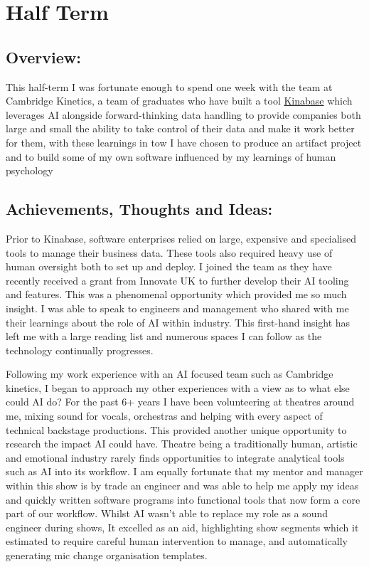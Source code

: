 \section{Half Term}

\subsection*{Overview:}
This half-term I was fortunate enough to spend one week with the team at Cambridge Kinetics, a team of graduates who have built a tool \href{https://www.kinabase.com}{Kinabase} which leverages AI alongside forward-thinking data handling to provide companies both large and small the ability to take control of their data and make it work better for them, with these learnings in tow I have chosen to produce an artifact project and to build some of my own software influenced by my learnings of human psychology

\subsection*{Achievements, Thoughts and Ideas:}
Prior to Kinabase, software enterprises relied on large, expensive and specialised tools to manage their business data. These tools also required heavy use of human oversight both to set up and deploy. I joined the team as they have recently received a grant from Innovate UK to further develop their AI tooling and features. This was a phenomenal opportunity which provided me so much insight. I was able to speak to engineers and management who shared with me their learnings about the role of AI within industry. This first-hand insight has left me with a large reading list and numerous spaces I can follow as the technology continually progresses.

Following my work experience with an AI focused team such as Cambridge kinetics, I began to approach my other experiences with a view as to what else could AI do? For the past 6+ years I have been volunteering at theatres around me, mixing sound for vocals, orchestras and helping with every aspect of technical backstage productions. This provided another unique opportunity to research the impact AI could have. Theatre being a traditionally human, artistic and emotional industry rarely finds opportunities to integrate analytical tools such as AI into its workflow. I am equally fortunate that my mentor and manager within this show is by trade an engineer and was able to help me apply my ideas and quickly written software programs into functional tools that now form a core part of our workflow. Whilst AI wasn't able to replace my role as a sound engineer during shows, It excelled as an aid, highlighting show segments which it estimated to require careful human intervention to manage, and automatically generating mic change organisation templates.


